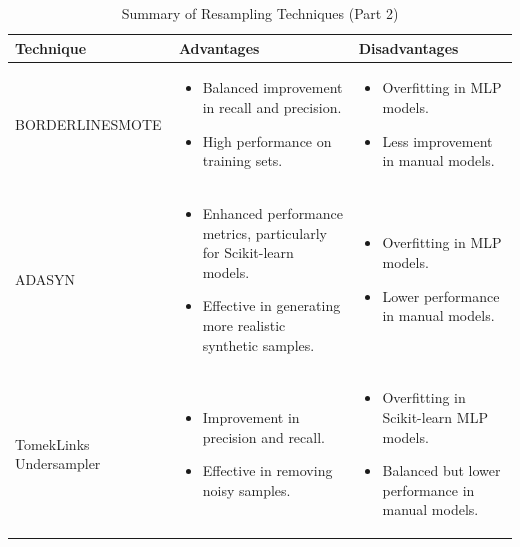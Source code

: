 \documentclass[a4paper,12pt]{article}
\begin{document}
\begin{table}[h!]
    \centering
    \caption{Summary of Resampling Techniques (Part 2)}
    \begin{tabularx}{\textwidth}{|l|X|X|}
    \hline
    \textbf{Technique} & \textbf{Advantages} & \textbf{Disadvantages} \\
    \hline
    BORDERLINESMOTE & 
    \begin{itemize}
        \item Balanced improvement in recall and precision.
        \item High performance on training sets.
    \end{itemize} & 
    \begin{itemize}
        \item Overfitting in MLP models.
        \item Less improvement in manual models.
    \end{itemize} \\
    \hline
    ADASYN & 
    \begin{itemize}
        \item Enhanced performance metrics, particularly for Scikit-learn models.
        \item Effective in generating more realistic synthetic samples.
    \end{itemize} & 
    \begin{itemize}
        \item Overfitting in MLP models.
        \item Lower performance in manual models.
    \end{itemize} \\
    \hline
    TomekLinks Undersampler & 
    \begin{itemize}
        \item Improvement in precision and recall.
        \item Effective in removing noisy samples.
    \end{itemize} & 
    \begin{itemize}
        \item Overfitting in Scikit-learn MLP models.
        \item Balanced but lower performance in manual models.
    \end{itemize} \\
    \hline
    \end{tabularx}
\end{table}

\newpage
\end{document}
